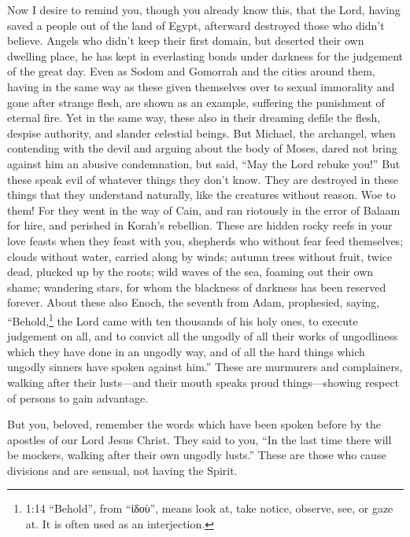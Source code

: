  Now I desire to remind you, though you already know this,
that the Lord, having saved a people out of the land of Egypt, afterward
destroyed those who didn't believe.  Angels who didn't keep
their first domain, but deserted their own dwelling place, he has kept
in everlasting bonds under darkness for the judgement of the great day.
 Even as Sodom and Gomorrah and the cities around them,
having in the same way as these given themselves over to sexual
immorality and gone after strange flesh, are shown as an example,
suffering the punishment of eternal fire.  Yet in the same
way, these also in their dreaming defile the flesh, despise authority,
and slander celestial beings.  But Michael, the archangel,
when contending with the devil and arguing about the body of Moses,
dared not bring against him an abusive condemnation, but said, ``May the
Lord rebuke you!''  But these speak evil of whatever things
they don't know. They are destroyed in these things that they understand
naturally, like the creatures without reason.  Woe to them!
For they went in the way of Cain, and ran riotously in the error of
Balaam for hire, and perished in Korah's rebellion.  These
are hidden rocky reefs in your love feasts when they feast with you,
shepherds who without fear feed themselves; clouds without water,
carried along by winds; autumn trees without fruit, twice dead, plucked
up by the roots;  wild waves of the sea, foaming out their
own shame; wandering stars, for whom the blackness of darkness has been
reserved forever.  About these also Enoch, the seventh from
Adam, prophesied, saying, ``Behold,\footnote{1:14 ``Behold'', from
  ``ἰδοὺ'', means look at, take notice, observe, see, or gaze at. It is
  often used as an interjection.} the Lord came with ten thousands of
his holy ones,  to execute judgement on all, and to convict
all the ungodly of all their works of ungodliness which they have done
in an ungodly way, and of all the hard things which ungodly sinners have
spoken against him.''  These are murmurers and complainers,
walking after their lusts---and their mouth speaks proud
things---showing respect of persons to gain advantage.

 But you, beloved, remember the words which have been
spoken before by the apostles of our Lord Jesus Christ. 
They said to you, ``In the last time there will be mockers, walking
after their own ungodly lusts.''  These are those who cause
divisions and are sensual, not having the Spirit.

